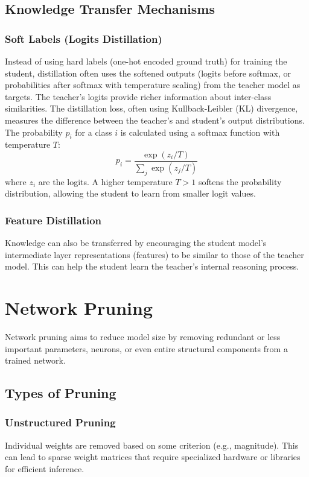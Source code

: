 \documentclass{article}
\begin{document}
\subsection{Knowledge Transfer Mechanisms}
\subsubsection{Soft Labels (Logits Distillation)}
Instead of using hard labels (one-hot encoded ground truth) for training the student, distillation often uses the softened outputs (logits before softmax, or probabilities after softmax with temperature scaling) from the teacher model as targets. The teacher's logits provide richer information about inter-class similarities.
The distillation loss, often using Kullback-Leibler (KL) divergence, measures the difference between the teacher's and student's output distributions.
The probability $p_i$ for a class $i$ is calculated using a softmax function with temperature $T$:
$$ p_i = \frac{\exp(z_i / T)}{\sum_j \exp(z_j / T)} $$
where $z_i$ are the logits. A higher temperature $T > 1$ softens the probability distribution, allowing the student to learn from smaller logit values.

\subsubsection{Feature Distillation}
Knowledge can also be transferred by encouraging the student model's intermediate layer representations (features) to be similar to those of the teacher model. This can help the student learn the teacher's internal reasoning process.

\section{Network Pruning}
Network pruning aims to reduce model size by removing redundant or less important parameters, neurons, or even entire structural components from a trained network.

\subsection{Types of Pruning}
\subsubsection{Unstructured Pruning}
Individual weights are removed based on some criterion (e.g., magnitude). This can lead to sparse weight matrices that require specialized hardware or libraries for efficient inference.
\end{document}
